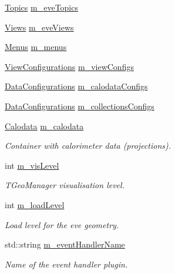 \begin{DoxyCompactItemize}
\hyperlink{class_d_d4hep_1_1_display_ab7cf442eb2211f57f55b7cd1cf8a61c1}{Topics} \hyperlink{class_d_d4hep_1_1_display_a2b79f980245e444a7d9e70d09b043e07}{m\_\-eveTopics}
\item 
\hyperlink{class_d_d4hep_1_1_display_a93fcdf6ec0390291e26d59d0d78cd6e8}{Views} \hyperlink{class_d_d4hep_1_1_display_a5cbd62240a063355076bc617b80a7120}{m\_\-eveViews}
\item 
\hyperlink{class_d_d4hep_1_1_display_a4dbc259bd581b56802ef3c29b72909be}{Menus} \hyperlink{class_d_d4hep_1_1_display_aa6b6e111d83802be4a9a39024cfda066}{m\_\-menus}
\item 
\hyperlink{class_d_d4hep_1_1_display_a1bb7fbc1eeb22ef2b1cea35c78e9d27a}{ViewConfigurations} \hyperlink{class_d_d4hep_1_1_display_aaa73b23932af6bf1d1f1e37d621e564c}{m\_\-viewConfigs}
\item 
\hyperlink{class_d_d4hep_1_1_display_a730a4516989abe8b2f788c8f957e0633}{DataConfigurations} \hyperlink{class_d_d4hep_1_1_display_a6b3fd66eb5ee434f3cf10b2934cb71a3}{m\_\-calodataConfigs}
\item 
\hyperlink{class_d_d4hep_1_1_display_a730a4516989abe8b2f788c8f957e0633}{DataConfigurations} \hyperlink{class_d_d4hep_1_1_display_af1a17085548605e16470dc43e017d209}{m\_\-collectionsConfigs}
\item 
\hyperlink{class_d_d4hep_1_1_display_a692339ace65797a205d2332c4a652598}{Calodata} \hyperlink{class_d_d4hep_1_1_display_a5f32c54601dd6e6a8556e6ffbafb10cc}{m\_\-calodata}
\begin{DoxyCompactList}\small\item\em Container with calorimeter data (projections). \item\end{DoxyCompactList}\item 
int \hyperlink{class_d_d4hep_1_1_display_a1e2bb859df3df7dc1bbc6447094e8f66}{m\_\-visLevel}
\begin{DoxyCompactList}\small\item\em TGeoManager visualisation level. \item\end{DoxyCompactList}\item 
int \hyperlink{class_d_d4hep_1_1_display_a82e390dcf9124ff53abd433e9b0bcef5}{m\_\-loadLevel}
\begin{DoxyCompactList}\small\item\em Load level for the eve geometry. \item\end{DoxyCompactList}\item 
std::string \hyperlink{class_d_d4hep_1_1_display_a0a6d204fcf140071018ef6cb3040c19b}{m\_\-eventHandlerName}
\begin{DoxyCompactList}\small\item\em Name of the event handler plugin. \item\end{DoxyCompactList}\end{DoxyCompactItemize}



